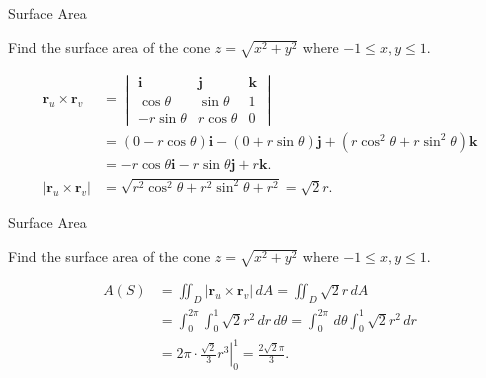 \documentclass[11pt,english,
handout
]{beamer}
\begin{document}
\begin{frame}[t]{Surface Area}
\small
\begin{example}
Find the surface area of the cone $z=\sqrt{x^2+y^2}$ where $-1\leq x,y\leq 1$.

\lspace
\begin{align*}
\mathbf{r}_u\times \mathbf{r}_v&=\begin{vmatrix}\mathbf{i}&\mathbf{j}&\mathbf{k}\\[2mm] \cos\theta & \sin\theta & 1\\[2mm] -r\sin\theta & r\cos\theta & 0\end{vmatrix}\\[2mm]
&=(0-r\cos\theta)\mathbf{i}-(0+r\sin\theta)\mathbf{j}+(r\cos^2\theta+r\sin^2\theta)\mathbf{k}\\[2mm]
&=-r\cos\theta\mathbf{i}-r\sin\theta\mathbf{j}+r\mathbf{k}.\\[4mm]
|\mathbf{r}_u\times\mathbf{r}_v|&=\sqrt{r^2\cos^2\theta+r^2\sin^2\theta+r^2}=\sqrt{2}r.
\end{align*}
\end{example}
\end{frame}















\begin{frame}[t]{Surface Area}
\small
\begin{example}
Find the surface area of the cone $z=\sqrt{x^2+y^2}$ where $-1\leq x,y\leq 1$.

\lspace

\begin{align*}
A(S)&=\iint_D|\mathbf{r}_u\times\mathbf{r}_v|\,dA=\iint_D\sqrt{2}r\,dA\\[2mm]
&=\int_0^{2\pi}\int_0^1\sqrt{2}r^2\,dr\,d\theta=\int_0^{2\pi}\,d\theta\int_0^1\sqrt{2}r^2\,dr\\[2mm]
&=2\pi\cdot\left.\frac{\sqrt{2}}{3}r^3\right|_0^1=\frac{2\sqrt{2}\pi}{3}.
\end{align*}
\end{example}
\end{frame}
\end{document}
